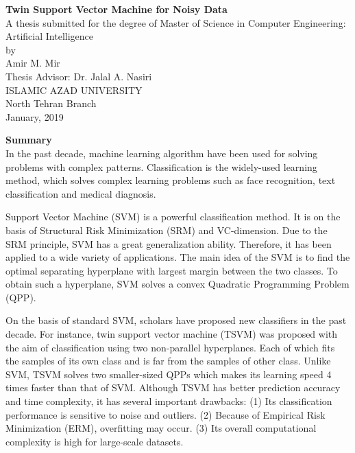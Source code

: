 \documentclass[a4paper, 12pt]{article}
\begin{document}
	
\begin{center}
	{\Large \textbf{Twin Support Vector Machine for Noisy Data}} \\[0.5cm]
	
	A thesis submitted for the degree of Master of Science in Computer Engineering: Artificial Intelligence \\[0.25cm]
	
	by \\[0.25cm]
	{\large Amir M. Mir} \\ [0.5cm]
	
	Thesis Advisor: {Dr. Jalal A. Nasiri} \\[0.25cm]
	
	ISLAMIC AZAD UNIVERSITY \\
	North Tehran Branch \\[0.25cm]
	
	January, 2019
	
\end{center}

\large{\textbf{Summary}}\\[0.25cm]

In the past decade, machine learning algorithm have been used for solving problems with complex patterns. Classification is the widely-used learning method, which solves complex learning problems such as face recognition, text classification and medical diagnosis.

Support Vector Machine (SVM) is a powerful classification method. It is on the basis of Structural Risk Minimization (SRM) and VC-dimension. Due to the SRM principle, SVM has a great generalization ability. Therefore, it has been applied to a wide variety of applications. The main idea of the SVM is to find the optimal separating hyperplane with largest margin between the two classes. To obtain such a hyperplane, SVM solves a convex Quadratic Programming Problem (QPP). 

On the basis of standard SVM, scholars have proposed new classifiers in the past decade. For instance, twin support vector machine (TSVM) was proposed with the aim of classification using two non-parallel hyperplanes. Each of which fits the samples of its own class and is far from the samples of other class. Unlike SVM, TSVM solves two smaller-sized QPPs which makes its learning speed 4 times faster than that of SVM. Although TSVM has better prediction accuracy and time complexity, it has several important drawbacks: (1) Its classification performance is sensitive to noise and outliers. (2) Because of Empirical Risk Minimization (ERM), overfitting may occur. (3) Its overall computational complexity is high for large-scale datasets.
\end{document}
